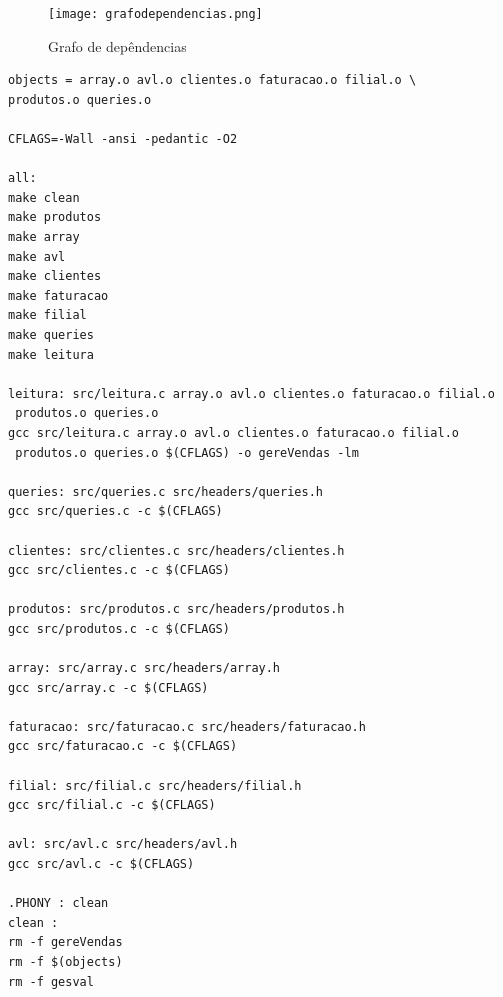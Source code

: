 \begin{figure}[h!]
	\centering
	\texttt{[image: grafodependencias.png]}  
	\caption{Grafo de depêndencias}  
\end{figure}

\begin{verbatim}
objects = array.o avl.o clientes.o faturacao.o filial.o \
produtos.o queries.o 

CFLAGS=-Wall -ansi -pedantic -O2

all:
make clean
make produtos
make array
make avl
make clientes
make faturacao
make filial
make queries
make leitura

leitura: src/leitura.c array.o avl.o clientes.o faturacao.o filial.o
 produtos.o queries.o 
gcc src/leitura.c array.o avl.o clientes.o faturacao.o filial.o
 produtos.o queries.o $(CFLAGS) -o gereVendas -lm

queries: src/queries.c src/headers/queries.h
gcc src/queries.c -c $(CFLAGS)

clientes: src/clientes.c src/headers/clientes.h
gcc src/clientes.c -c $(CFLAGS)

produtos: src/produtos.c src/headers/produtos.h
gcc src/produtos.c -c $(CFLAGS)

array: src/array.c src/headers/array.h
gcc src/array.c -c $(CFLAGS)

faturacao: src/faturacao.c src/headers/faturacao.h
gcc src/faturacao.c -c $(CFLAGS)

filial: src/filial.c src/headers/filial.h
gcc src/filial.c -c $(CFLAGS)

avl: src/avl.c src/headers/avl.h
gcc src/avl.c -c $(CFLAGS)

.PHONY : clean
clean :
rm -f gereVendas
rm -f $(objects)
rm -f gesval
\end{verbatim}
